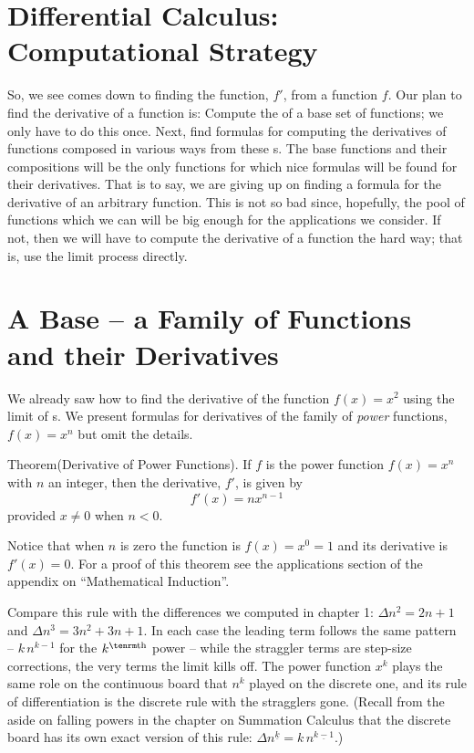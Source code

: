 \section{Differential Calculus: Computational Strategy}
So, we see  comes down to finding the 
function, $f'$, from a function $f$. 
Our plan to find the derivative of a function is: 
Compute the  of 
a base set of functions; we only have to do 
this once. Next, find formulas for computing the derivatives of 
functions composed in various ways from these s. The base 
functions and their compositions will be the only functions for which 
nice formulas will be found for their derivatives.
That is to say, we 
are giving up on finding a formula for the derivative of an arbitrary 
function. This is 
not so bad since, hopefully, the pool of functions which we can 
will be big enough for the applications we consider. If not, then we will 
have to compute the derivative of a function the hard way; that is, use 
the limit process directly.

\section{A Base -- a Family of Functions and their Derivatives}
We already saw how to find the derivative of the function $f(x) = x^2$ using 
the limit of s.
We present formulas for derivatives of the family of {\it power\/} functions, 
$f(x) = x^n$ but omit the details.

\proclaim Theorem(Derivative of Power Functions). If $f$ is the 
power function $f(x) = x^n$ with $n$ 
an integer, 
then the derivative, $f'$, is given by
$$
f'(x) = n x ^{n-1}
$$
provided $x \neq 0$ when $n < 0$.

Notice that when $n$ is zero the function is $f(x) = x^0 = 1$ and its
derivative is $f'(x) = 0$. For a proof of this theorem see the applications section
of the appendix on ``Mathematical Induction''.

Compare this rule with the differences we computed in chapter 1:
$\Delta n^2 = 2n + 1$ and $\Delta n^3 = 3n^2 + 3n + 1$.
In each case the leading term follows the same pattern -- $k\,n^{k-1}$ for
the $k^{\rm th}$ power -- while the straggler terms are step-size corrections,
the very terms the limit kills off. The power function $x^k$ plays the same role
on the continuous board that $n^k$ played on the discrete one, and its rule
of differentiation is the discrete rule with the stragglers gone.
(Recall from the aside on falling powers in the chapter on Summation
Calculus that the discrete board has its own exact version of this rule:
$\Delta n^{\underline{k}} = k\, n^{\underline{k-1}}$.)

